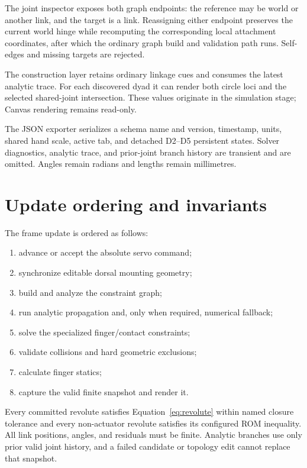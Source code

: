 \documentclass[11pt]{article}
\begin{document}
The joint inspector exposes both graph endpoints: the reference may be world
or another link, and the target is a link. Reassigning either endpoint preserves
the current world hinge while recomputing the corresponding local attachment
coordinates, after which the ordinary graph build and validation path runs.
Self-edges and missing targets are rejected.

The construction layer retains ordinary linkage cues and consumes the latest
analytic trace. For each discovered dyad it can render both circle loci and the
selected shared-joint intersection. These values originate in the simulation
stage; Canvas rendering remains read-only.

The JSON exporter serializes a schema name and version, timestamp, units,
shared hand scale, active tab, and detached D2--D5 persistent states. Solver
diagnostics, analytic trace, and prior-joint branch history are transient and
are omitted. Angles remain radians and lengths remain millimetres.

\section{Update ordering and invariants}

The frame update is ordered as follows:
\begin{enumerate}
  \item advance or accept the absolute servo command;
  \item synchronize editable dorsal mounting geometry;
  \item build and analyze the constraint graph;
  \item run analytic propagation and, only when required, numerical fallback;
  \item solve the specialized finger/contact constraints;
  \item validate collisions and hard geometric exclusions;
  \item calculate finger statics;
  \item capture the valid finite snapshot and render it.
\end{enumerate}
Every committed revolute satisfies Equation~\eqref{eq:revolute} within named
closure tolerance and every non-actuator revolute satisfies its configured ROM
inequality. All link positions, angles, and residuals must be finite. Analytic
branches use only prior valid joint history, and a failed candidate or topology
edit cannot replace that snapshot.
\end{document}
